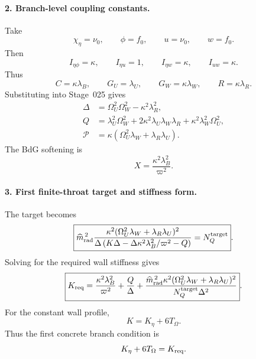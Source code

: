 \paragraph{2. Branch-level coupling constants.}
Take
\begin{equation}
\label{eq:app-stage026-profile-choice}
\chi_\eta=\nu_0,
\qquad
\phi=f_0,
\qquad
u=\nu_0,
\qquad
w=f_0.
\end{equation}
Then
\begin{equation}
\label{eq:app-stage026-overlaps}
I_{\eta\phi}=\kappa,
\qquad
I_{\eta u}=1,
\qquad
I_{\eta w}=\kappa,
\qquad
I_{uw}=\kappa.
\end{equation}
Thus
\begin{equation}
\label{eq:app-stage026-couplings}
\boxed{
C=\kappa\lambda_B,
\qquad
G_U=\lambda_U,
\qquad
G_W=\kappa\lambda_W,
\qquad
R=\kappa\lambda_R}.
\end{equation}
Substituting into Stage~025 gives
\begin{equation}
\label{eq:app-stage026-DeltaQP}
\boxed{
\begin{aligned}
\Delta&=\Omega_U^2\Omega_W^2-\kappa^2\lambda_R^2,\\
Q&=\lambda_U^2\Omega_W^2+2\kappa^2\lambda_U\lambda_W\lambda_R+\kappa^2\lambda_W^2\Omega_U^2,\\
\mathcal P&=\kappa(\Omega_U^2\lambda_W+\lambda_R\lambda_U).
\end{aligned}
}
\end{equation}
The BdG softening is
\begin{equation}
\label{eq:app-stage026-X}
X=\frac{\kappa^2\lambda_B^2}{\varpi^2}.
\end{equation}

\paragraph{3. First finite-throat target and stiffness form.}
The target becomes
\begin{equation}
\label{eq:app-stage026-normalization}
\boxed{
\widehat m_{\rm rad}^{\,2}
\frac{\kappa^2(\Omega_U^2\lambda_W+\lambda_R\lambda_U)^2}
{\Delta\left(K\Delta-\Delta\kappa^2\lambda_B^2/\varpi^2-Q\right)}
=N_Q^{\rm target}}.
\end{equation}
Solving for the required wall stiffness gives
\begin{equation}
\label{eq:app-stage026-Kreq}
\boxed{
K_{\rm req}
=\frac{\kappa^2\lambda_B^2}{\varpi^2}
+\frac{Q}{\Delta}
+\frac{\widehat m_{\rm rad}^{\,2}\kappa^2(\Omega_U^2\lambda_W+\lambda_R\lambda_U)^2}
{N_Q^{\rm target}\Delta^2}}.
\end{equation}
For the constant wall profile,
\begin{equation}
\label{eq:app-stage026-Kgeo}
K=K_\eta+6T_\Omega.
\end{equation}
Thus the first concrete branch condition is
\begin{equation}
\label{eq:app-stage026-branch-condition}
K_\eta+6T_\Omega=K_{\rm req}.
\end{equation}

